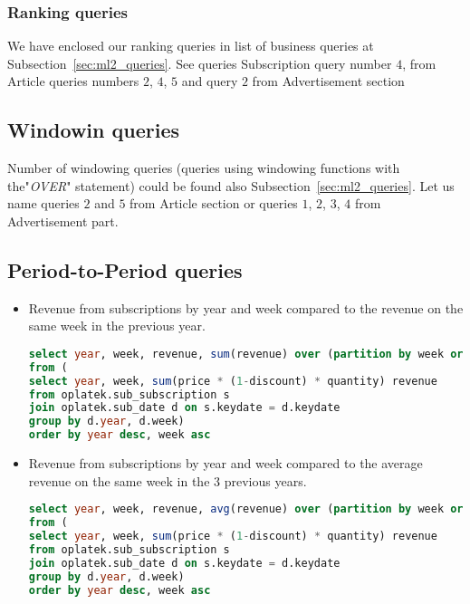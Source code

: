 \subsubsection{Ranking queries} %
\label{ssub:Ranking queries}
We have enclosed our ranking queries in list of business queries at Subsection~\ref{sec:ml2_queries}.
See queries Subscription query number $4$, from Article queries numbers $2$, $4$, $5$
and query $2$ from Advertisement section

\subsection{Windowin queries} %
\label{sub:Windowin queries}
Number of windowing queries (queries using windowing functions with the"{\it OVER}" statement)
could be found also Subsection~\ref{sec:ml2_queries}.
Let us name queries $2$ and $5$ from Article section or queries $1$, $2$, $3$, $4$ from Advertisement part.

\subsection{Period-to-Period queries} %
\label{sub:Period-to-Period queries}
\begin{itemize}
    \item Revenue from subscriptions by year and week compared to the revenue on the same week in the previous year.
\begin{lstlisting}[language=sql] 
select year, week, revenue, sum(revenue) over (partition by week order by year RANGE BETWEEN 1 PRECEDING AND 1 PRECEDING) revenue_last_year_this_week        
from (
select year, week, sum(price * (1-discount) * quantity) revenue 
from oplatek.sub_subscription s 
join oplatek.sub_date d on s.keydate = d.keydate 
group by d.year, d.week)
order by year desc, week asc
\end{lstlisting}

\item Revenue from subscriptions by year and week compared to the average revenue on the same week in the 3 previous years.
\begin{lstlisting}[language=sql] 
select year, week, revenue, avg(revenue) over (partition by week order by year RANGE BETWEEN 3 PRECEDING AND 1 PRECEDING) avg_revenue_prev_3_years        
from (
select year, week, sum(price * (1-discount) * quantity) revenue 
from oplatek.sub_subscription s 
join oplatek.sub_date d on s.keydate = d.keydate
group by d.year, d.week)
order by year desc, week asc
\end{lstlisting}

\end{itemize}

